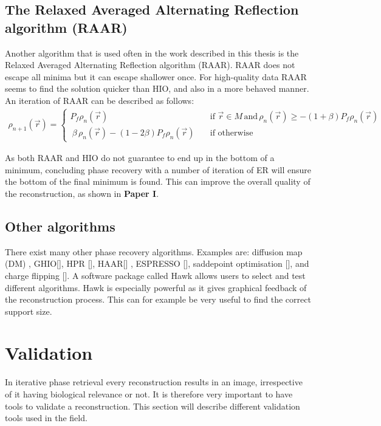\subsection{The Relaxed Averaged Alternating Reflection algorithm (RAAR)}
Another algorithm that is used often in the work described in this thesis is the Relaxed Averaged Alternating Reflection algorithm (RAAR). RAAR does not escape all minima but it can escape shallower once. For high-quality data RAAR seems to find the solution quicker than HIO, and also in a more behaved manner. An iteration of RAAR can be described as follows:
\begin{align}
\rho_{n+1}\left(\vec{r}\right) = \begin{cases} P_f \rho_{n}\left(\vec{r}\right) \quad & \mathrm{if} \,\,
    \vec{r} \in M\,\mathrm{and}\,\rho_n(\vec{r}) \geq -(1+\beta)P_f\rho_n(\vec{r}) \\\
    \beta\,\rho_n(\vec{r}) -(1-2\beta) P_f \rho_n(\vec{r}) \quad & \mathrm{if}\,\, \mathrm{otherwise} \end{cases}
\end{align}

As both RAAR and HIO do not guarantee to end up in the bottom of a minimum, concluding phase recovery with a number of iteration of ER will ensure the bottom of the final minimum is found. This can improve the overall quality of the reconstruction, as shown in \textbf{Paper I}.

\subsection{Other algorithms}
There exist many other phase recovery algorithms. Examples are: diffusion map (DM) \cite{Elser}, GHIO[], HPR [], HAAR[] , ESPRESSO [], saddepoint optimisation [], and charge flipping []. A software package called Hawk allows users to select and test different algorithms. Hawk is especially powerful as it gives graphical feedback of the reconstruction process. This can for example be very useful to find the correct support size. 

\section{Validation}
In iterative phase retrieval every reconstruction results in an image, irrespective of it having biological relevance or not. It is therefore very important to have tools to validate a reconstruction. This section will describe different validation tools used in the field.

